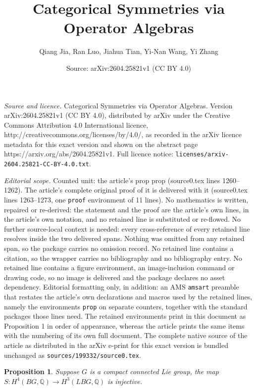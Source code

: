 \documentclass[10pt,a4paper]{amsart}
\title{\boldmath Categorical Symmetries via Operator Algebras}
\author{Qiang Jia, Ran Luo, Jiahua Tian, Yi-Nan Wang, Yi Zhang}
\date{Source: arXiv:2604.25821v1 (CC BY 4.0)}
\newtheorem{prop}{Proposition}
\def\bbQ{\mathbb{Q}}
\begin{document}
\maketitle

\noindent\emph{Source and licence.} \boldmath Categorical Symmetries via Operator Algebras. Version arXiv:2604.25821v1 (CC BY 4.0), distributed by arXiv under the Creative Commons Attribution 4.0 International licence, http://creativecommons.org/licenses/by/4.0/, as recorded in the arXiv licence metadata for this exact version and shown on the abstract page https://arxiv.org/abs/2604.25821v1. Full licence notice: \texttt{licenses/arxiv-2604.25821-CC-BY-4.0.txt}.\par\smallskip

\noindent\textit{Editorial scope.} Counted unit: the article's prop prop (source0.tex lines 1260--1262). The article's complete original proof of it is delivered with it (source0.tex lines 1263--1273, one \texttt{proof} environment of 11 lines). No mathematics is written, repaired or re-derived: the statement and the proof are the article's own lines, in the article's own notation, and no retained line is substituted or re-flowed.  No further source-local context is needed: every cross-reference of every retained line resolves inside the two delivered spans.  Nothing was omitted from any retained span, so the package carries no omission record.  No retained line contains a citation, so the wrapper carries no bibliography and no bibliography entry.  No retained line contains a figure environment, an image-inclusion command or drawing code, so no image is delivered and the package declares no asset dependency.  Editorial formatting only, in addition: an AMS \texttt{amsart} preamble that restates the article's own declarations and macros used by the retained lines, namely the environments \texttt{prop} on separate counters, together with the standard packages those lines need.  The retained environments print in this document as Proposition 1 in order of appearance, whereas the article prints the same items with the numbering of its own full document.  The complete native source of the article as distributed in the arXiv e-print for this exact version is bundled unchanged as \texttt{sources/199332/source0.tex}.
\begin{prop}
    Suppose $G$ is a compact connected Lie group, the map $S:H^4(BG,\bbQ) \to H^3(LBG,\bbQ)$ is injective.
\end{prop}
\end{document}
